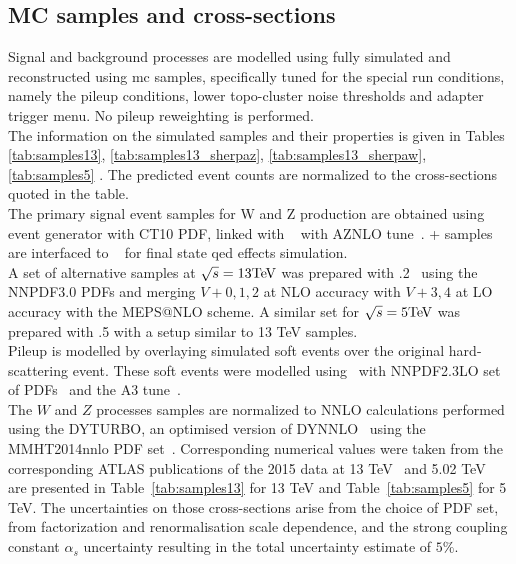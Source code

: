     \subsection{MC samples and cross-sections}
    Signal and background processes are modelled using fully simulated and reconstructed using \gls{mc} samples, specifically tuned for the special run conditions, namely the pileup conditions, lower topo-cluster noise thresholds and adapter trigger menu. No pileup reweighting is performed.\\
    The information on the simulated samples and their properties is given in Tables \ref{tab:samples13}, \ref{tab:samples13_sherpaz}, \ref{tab:samples13_sherpaw},  \ref{tab:samples5} \cite{Kretzschmar:2657141}. The predicted event counts are normalized to the cross-sections quoted in the table.\\
    The primary signal event samples for W and Z production are obtained using \Powheg~\cite{Nason:2004rx,Frixione:2007vw,Alioli:2008gx,Alioli:2010xd} event generator with CT10 PDF, linked with \Pythia~\cite{pythia} with AZNLO tune~\cite{STDM-2012-23}. \Powheg+ samples are interfaced to \Photos~\cite{Golonka:2005pn}  for final state \gls{qed} effects simulation.\\
    A set of alternative samples at $\sqrt{s} = 13\text{Te\kern -0.1em V}$ was prepared with .2~\cite{Hoche:2010kg} using the NNPDF3.0 PDFs and merging
    $V+0,1,2$ at NLO accuracy with $V+3,4$ at LO accuracy with the MEPS@NLO scheme. A similar set for $\sqrt{s} = 5\text{Te\kern -0.1em V}$ was prepared with .5 with a setup similar to 13 TeV samples.\\
    Pileup is modelled by overlaying simulated soft events over the original hard-scattering event. These soft events were modelled using \Pythia\ with NNPDF2.3LO set of PDFs~\cite{Ball:2012cx} and the A3 tune~\cite{ATL-PHYS-PUB-2016-017}.\\
    The $W$ and $Z$ processes samples are normalized to NNLO
    calculations performed using the DYTURBO, an optimised version
    of DYNNLO~\cite{Catani:2007vq,Catani:2009sm} using the MMHT2014nnlo PDF
    set~\cite{Harland-Lang:2014zoa}. Corresponding numerical values were taken from
    the corresponding ATLAS publications of the 2015 data at 13
    TeV~\cite{STDM-2015-03} and 5.02 TeV~\cite{HION-2018-02} are presented in Table~\ref{tab:samples13} for 13 TeV and Table~\ref{tab:samples5} for 5 TeV. The
    uncertainties on those cross-sections arise from the choice of PDF set, from factorization
    and renormalisation scale dependence, and the strong
    coupling constant $\alpha_s$ uncertainty resulting in the total 
    uncertainty estimate of $5\%$.
    
